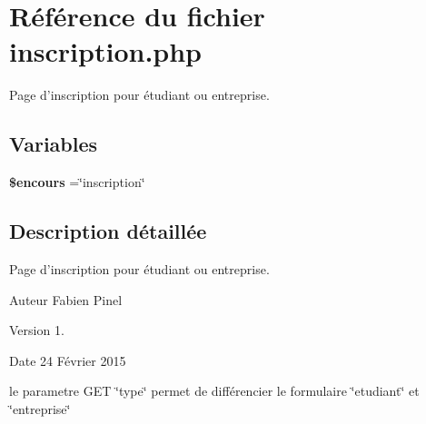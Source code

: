 \hypertarget{inscription_8php}{\section{Référence du fichier inscription.\-php}
\label{inscription_8php}
}


Page d'inscription pour étudiant ou entreprise.  


\subsection*{Variables}
\begin{DoxyCompactItemize}
\item 
\hypertarget{inscription_8php_af7b0e56292699e6983c24fbbf70ce08d}{{\bfseries \$encours} =\char`\"{}inscription\char`\"{}}\label{inscription_8php_af7b0e56292699e6983c24fbbf70ce08d}

\end{DoxyCompactItemize}


\subsection{Description détaillée}
Page d'inscription pour étudiant ou entreprise. \begin{DoxyAuthor}{Auteur}
Fabien Pinel 
\end{DoxyAuthor}
\begin{DoxyVersion}{Version}
1. 
\end{DoxyVersion}
\begin{DoxyDate}{Date}
24 Février 2015
\end{DoxyDate}
le parametre G\-E\-T \char`\"{}type\char`\"{} permet de différencier le formulaire \char`\"{}etudiant\char`\"{} et \char`\"{}entreprise\char`\"{} 